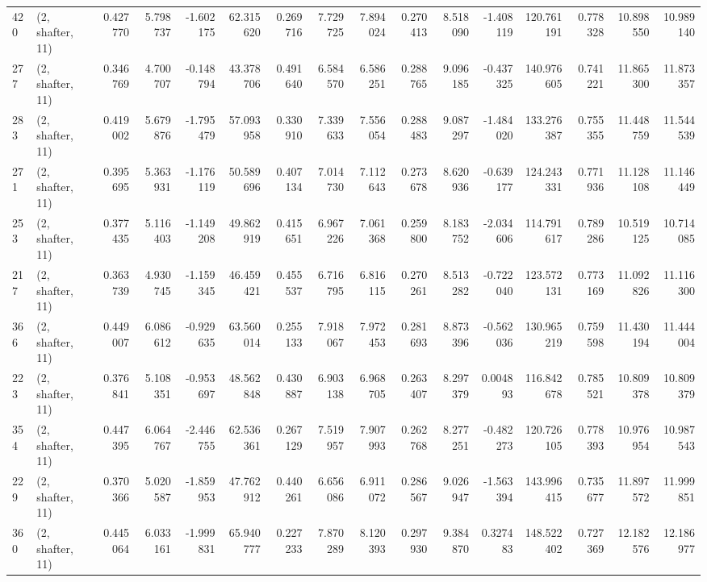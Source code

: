 \begin{tabular}{llrrrrrrrrrrrrrr}
420 &  (2, shafter, 11) &   0.427770 &   5.798737 &  -1.602175 &    62.315620 &   0.269716 &   7.729725 &   7.894024 &  0.270413 &   8.518090 &  -1.408119 &   120.761191 &   0.778328 &  10.898550 &  10.989140 \\
277 &  (2, shafter, 11) &   0.346769 &   4.700707 &  -0.148794 &    43.378706 &   0.491640 &   6.584570 &   6.586251 &  0.288765 &   9.096185 &  -0.437325 &   140.976605 &   0.741221 &  11.865300 &  11.873357 \\
283 &  (2, shafter, 11) &   0.419002 &   5.679876 &  -1.795479 &    57.093958 &   0.330910 &   7.339633 &   7.556054 &  0.288483 &   9.087297 &  -1.484020 &   133.276387 &   0.755355 &  11.448759 &  11.544539 \\
271 &  (2, shafter, 11) &   0.395695 &   5.363931 &  -1.176119 &    50.589696 &   0.407134 &   7.014730 &   7.112643 &  0.273678 &   8.620936 &  -0.639177 &   124.243331 &   0.771936 &  11.128108 &  11.146449 \\
253 &  (2, shafter, 11) &   0.377435 &   5.116403 &  -1.149208 &    49.862919 &   0.415651 &   6.967226 &   7.061368 &  0.259800 &   8.183752 &  -2.034606 &   114.791617 &   0.789286 &  10.519125 &  10.714085 \\
217 &  (2, shafter, 11) &   0.363739 &   4.930745 &  -1.159345 &    46.459421 &   0.455537 &   6.716795 &   6.816115 &  0.270261 &   8.513282 &  -0.722040 &   123.572131 &   0.773169 &  11.092826 &  11.116300 \\
366 &  (2, shafter, 11) &   0.449007 &   6.086612 &  -0.929635 &    63.560014 &   0.255133 &   7.918067 &   7.972453 &  0.281693 &   8.873396 &  -0.562036 &   130.965219 &   0.759598 &  11.430194 &  11.444004 \\
223 &  (2, shafter, 11) &   0.376841 &   5.108351 &  -0.953697 &    48.562848 &   0.430887 &   6.903138 &   6.968705 &  0.263407 &   8.297379 &   0.004893 &   116.842678 &   0.785521 &  10.809378 &  10.809379 \\
354 &  (2, shafter, 11) &   0.447395 &   6.064767 &  -2.446755 &    62.536361 &   0.267129 &   7.519957 &   7.907993 &  0.262768 &   8.277251 &  -0.482273 &   120.726105 &   0.778393 &  10.976954 &  10.987543 \\
229 &  (2, shafter, 11) &   0.370366 &   5.020587 &  -1.859953 &    47.762912 &   0.440261 &   6.656086 &   6.911072 &  0.286567 &   9.026947 &  -1.563394 &   143.996415 &   0.735677 &  11.897572 &  11.999851 \\
360 &  (2, shafter, 11) &   0.445064 &   6.033161 &  -1.999831 &    65.940777 &   0.227233 &   7.870289 &   8.120393 &  0.297930 &   9.384870 &   0.327483 &   148.522402 &   0.727369 &  12.182576 &  12.186977 \\

\end{tabular}
